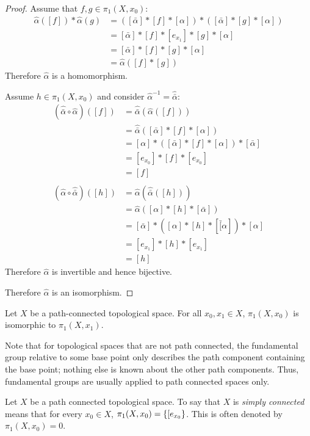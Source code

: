 \documentclass[letterpaper,12pt,fleqn]{article}
\renewcommand{\a}{\alpha}
\begin{document}
\begin{proof}
  Assume that \(f,g\in\pi_1(X,x_0)\):
  \begin{align*}
    \hat{\a}([f])*\hat{\a}(g) &= ([\bar{\a}]*[f]*[\a])*([\bar{\a}]*[g]*[\a]) \\
    &= [\bar{\a}]*[f]*[e_{x_1}]*[g]*[\a] \\
    &= [\bar{\a}]*[f]*[g]*[\a] \\
    &= \hat{\a}([f]*[g])
  \end{align*}
  Therefore \(\hat{\a}\) is a homomorphism.

  Assume \(h\in\pi_1(X,x_0)\) and consider \(\hat{\a}^{-1}=\hat{\bar{\a}}\):
  \begin{align*}
    (\hat{\bar{\a}}\circ\hat{\a})([f]) &= \hat{\bar{\a}}(\hat{\a}([f])) \\
    &= \hat{\bar{\a}}([\bar{\a}]*[f]*[\a]) \\
    &= [\a]*([\bar{\a}]*[f]*[\a])*[\bar{\a}] \\
    &= [e_{x_0}]*[f]*[e_{x_0}] \\
    &= [f] \\
    \\
    (\hat{\a}\circ\hat{\bar{\a}})([h]) &= \hat{\a}(\hat{\bar{\a}}([h])) \\
    &= \hat{\a}([\a]*[h]*[\bar{\a}]) \\
    &= [\bar{\a}]*([\a]*[h]*[\bar[\a])*[\a] \\
    &= [e_{x_1}]*[h]*[e_{x_1}] \\
    &= [h]
  \end{align*}
  Therefore \(\hat{\a}\) is invertible and hence bijective.

  Therefore \(\hat{\a}\) is an isomorphism.
\end{proof}

\begin{corollary}
  Let \(X\) be a path-connected topological space.  For all \(x_0,x_1\in X\), \(\pi_1(X,x_0)\) is isomorphic to
  \(\pi_1(X,x_1)\).
\end{corollary}

Note that for topological spaces that are not path connected, the fundamental group relative to some base point
only describes the path component containing the base point; nothing else is known about the other path components.
Thus, fundamental groups are usually applied to path connected spaces only.

\begin{definition}
  Let \(X\) be a path connected topological space.  To say that \(X\) is \emph{simply connected} means that for
  every \(x_0\in X\), \(\pi_1(X,x_0)=\{[e_{x_0}\}\).  This is often denoted by \(\pi_1(X,x_0)=0\).
\end{definition}
\end{document}
